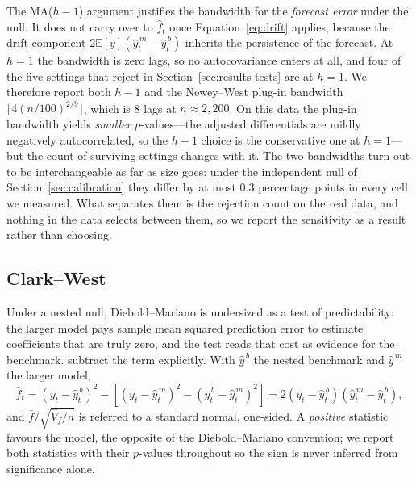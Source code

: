 \documentclass{article}
\theoremstyle{plain}
\theoremstyle{definition}
\begin{document}
The MA($h-1$) argument justifies the bandwidth for the \emph{forecast error} under
the null. It does not carry over to $\hat f_t$ once Equation~\eqref{eq:drift}
applies, because the drift component $2\mathbb{E}[y](\hat y^{\,m}_t - \hat
y^{\,b}_t)$ inherits the persistence of the forecast. At $h=1$ the bandwidth is
zero lags, so no autocovariance enters at all, and four of the five settings that
reject in Section~\ref{sec:results-tests} are at $h=1$. We therefore report both
$h-1$ and the Newey--West plug-in bandwidth $\lfloor 4(n/100)^{2/9}\rfloor$, which
is 8 lags at $n \approx 2{,}200$. On this data the plug-in bandwidth yields
\emph{smaller} $p$-values---the adjusted differentials are mildly negatively
autocorrelated, so the $h-1$ choice is the conservative one at $h=1$---but the count
of surviving settings changes with it. The two bandwidths turn out to be
interchangeable as far as size goes: under the independent null of
Section~\ref{sec:calibration} they differ by at most $0.3$ percentage points in
every cell we measured. What separates them is the rejection count on the real data,
and nothing in the data selects between them, so we report the sensitivity as a
result rather than choosing.

\subsection{Clark--West}
\label{sec:cw}

Under a nested null, Diebold--Mariano is undersized as a test of predictability:
the larger model pays sample mean squared prediction error to estimate
coefficients that are truly zero, and the test reads that cost as evidence for the
benchmark. \citet{clark2007} subtract the term explicitly. With $\hat{y}^{\,b}$
the nested benchmark and $\hat{y}^{\,m}$ the larger model,
%
\begin{equation}
  \hat{f}_t = \left(y_t - \hat{y}^{\,b}_t\right)^2
  - \left[\left(y_t - \hat{y}^{\,m}_t\right)^2
  - \left(\hat{y}^{\,b}_t - \hat{y}^{\,m}_t\right)^2\right]
  = 2\left(y_t - \hat{y}^{\,b}_t\right)\left(\hat{y}^{\,m}_t - \hat{y}^{\,b}_t\right),
  \label{eq:cw}
\end{equation}
%
and $\bar{f}/\sqrt{\hat{V}_f/n}$ is referred to a standard normal, one-sided. A
\emph{positive} statistic favours the model, the opposite of the Diebold--Mariano
convention; we report both statistics with their $p$-values throughout so the sign
is never inferred from significance alone.
\end{document}

